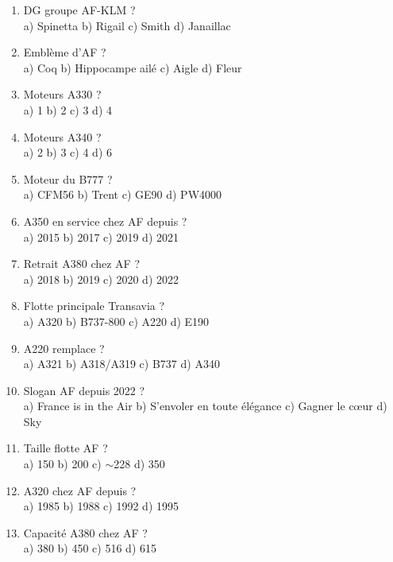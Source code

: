 \begin{enumerate}[nosep, start=21]
\item DG groupe AF-KLM ? \\ a) Spinetta \quad b) Rigail \quad c) Smith \quad d) Janaillac

\item Emblème d'AF ? \\ a) Coq \quad b) Hippocampe ailé \quad c) Aigle \quad d) Fleur

\item Moteurs A330 ? \\ a) 1 \quad b) 2 \quad c) 3 \quad d) 4

\item Moteurs A340 ? \\ a) 2 \quad b) 3 \quad c) 4 \quad d) 6

\item Moteur du B777 ? \\ a) CFM56 \quad b) Trent \quad c) GE90 \quad d) PW4000

\item A350 en service chez AF depuis ? \\ a) 2015 \quad b) 2017 \quad c) 2019 \quad d) 2021

\item Retrait A380 chez AF ? \\ a) 2018 \quad b) 2019 \quad c) 2020 \quad d) 2022

\item Flotte principale Transavia ? \\ a) A320 \quad b) B737-800 \quad c) A220 \quad d) E190

\item A220 remplace ? \\ a) A321 \quad b) A318/A319 \quad c) B737 \quad d) A340

\item Slogan AF depuis 2022 ? \\ a) France is in the Air \quad b) S'envoler en toute élégance \quad c) Gagner le c\oe ur \quad d) Sky

\item Taille flotte AF ? \\ a) 150 \quad b) 200 \quad c) $\sim$228 \quad d) 350

\item A320 chez AF depuis ? \\ a) 1985 \quad b) 1988 \quad c) 1992 \quad d) 1995

\item Capacité A380 chez AF ? \\ a) 380 \quad b) 450 \quad c) 516 \quad d) 615


\end{enumerate}
